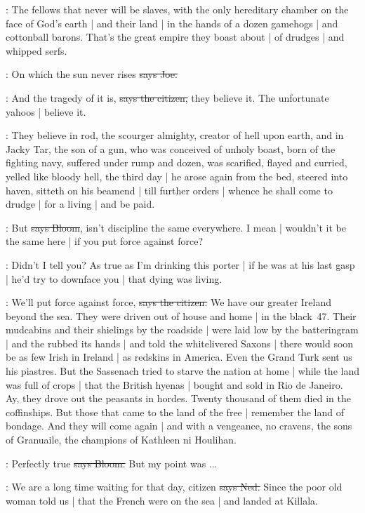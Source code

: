 \citizen:
The fellows that never will be slaves,
with the only hereditary chamber on the face of God's earth |
and their land |
in the hands of a dozen gamehogs |
and cottonball barons.
That's the great empire they boast about |
of drudges |
and whipped serfs.%

\joe:
On which the sun never rises
\sout{says Joe.}

\citizen:
And the tragedy of it is,
\sout{says the citizen,}
they believe it.
The unfortunate yahoos |
believe it.

:
They believe in rod,
the scourger almighty,
creator of hell upon earth,
and in Jacky Tar,
the son of a gun,
who was conceived of unholy boast,
born of the fighting navy,
suffered under rump and dozen,
was scarified,
flayed and curried,
yelled like bloody hell,
the third day |
he arose again from the bed,
steered into haven,
sitteth on his beamend |
till further orders |
whence he shall come to drudge |
for a living |
and be paid.

\Bloom:
But
\sout{says Bloom},
isn't discipline the same everywhere.
I mean |
wouldn't it be the same here |
if you put force against force?

\Nq:
Didn't I tell you?
As true as I'm drinking this porter |
if he was at his last gasp |
he'd try to downface you |
that dying was living.

\citizen:
We'll put force against force,
\sout{says the citizen.}
We have our greater Ireland beyond the sea.
They were driven out of house and home |
in the black~47.
Their mudcabins and their shielings by the roadside |
were laid low by the batteringram |
and the  rubbed its hands |
and told the whitelivered Saxons |
there would soon be as few Irish in Ireland |
as redskins in America.
Even the Grand Turk sent us his piastres.
But the Sassenach tried to starve the nation at home |
while the land was full of crops |
that the British hyenas |
bought and sold in Rio de Janeiro.
Ay,
they drove out the peasants in hordes.
Twenty thousand of them died in the coffinships.
But those that came to the land of the free |
remember the land of bondage.
And they will come again |
and with a vengeance,
no cravens,
the sons of Granuaile,
the champions of Kathleen ni Houlihan.

\Bloom:
Perfectly true
\sout{says Bloom.}
But my point was ...

\lambert:
We are a long time waiting for that day,
citizen
\sout{says Ned.}
Since the poor old woman told us |
that the French were on the sea |
and landed at Killala.

